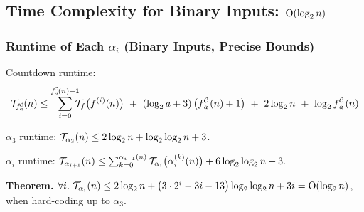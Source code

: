 \subsection{Time Complexity for Binary Inputs: $\text{O} (\log_2n)$}


\begin{frame}
\frametitle{Runtime of Each $\alpha_i$ (Binary Inputs, Precise Bounds)}

Countdown runtime:
\begin{equation*}
\runtime_{\cdt{f}{a}}(n) \le \sum_{i=0}^{\cdt{f}{a}(n) - 1} \hspace{-6pt}
\runtime_f\big(f^{(i)}(n)\big) \ + \ (\log_2a + 3)\left(\cdt{f}{a}(n) + 1\right) \ + \ 2\log_2n \ + \ \log_2\cdt{f}{a}(n)
\end{equation*}

\pause 
$\alpha_3$ runtime: $\mathcal{T}_{\alpha_3}(n) \le 2\log_2n + \log_2\log_2n + 3$.

\bigskip

\pause 
$\alpha_i$ runtime:
$
\mathcal{T}_{\alpha_{i+1}}(n) \le
\sum_{k=0}^{\alpha_{i+1}(n)}\mathcal{T}_{\alpha_i}\big(\alpha_i^{(k)}(n)\big)
+ 6\log_2\log_2n + 3.
$

\bigskip

\pause 
\textbf{Theorem.} $\forall i. \ \mathcal{T}_{\alpha_i}(n) \le 2\log_2n + \left(3\cdot 2^i - 3i - 13\right)\log_2\log_2n + 3i = \text{O}(\log_2n)$, when hard-coding up to $\alpha_3$.

\end{frame}




